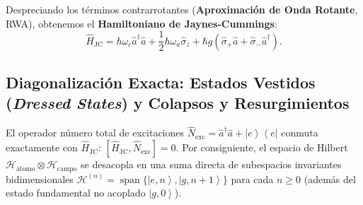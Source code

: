 \documentclass[11pt,a4paper,twoside]{report}
\theoremstyle{definition}
\theoremstyle{plain}
\theoremstyle{remark}
\newcommand{\ket}[1]{\left| #1 \right\rangle}
\newcommand{\ketbra}[2]{\left| #1 \right\rangle\!\left\langle #2 \right|}
\newcommand{\comm}[2]{\left[ #1, #2 \right]}
\newcommand{\Hil}{\mathcal{H}}
\newcommand{\op}[1]{\hat{#1}}
\begin{document}
Despreciando los términos contrarrotantes (\textbf{Aproximación de Onda Rotante}, RWA), obtenemos el \textbf{Hamiltoniano de Jaynes-Cummings}:
\begin{equation}
    \op{H}_{\text{JC}} = \hbar\omega_c \op{a}^\dagger\op{a} + \frac{1}{2}\hbar\omega_a \op{\sigma}_z + \hbar g\left( \op{\sigma}_+ \op{a} + \op{\sigma}_- \op{a}^\dagger \right).
\end{equation}

\subsection{Diagonalización Exacta: Estados Vestidos (\textit{Dressed States}) y Colapsos y Resurgimientos}

El operador número total de excitaciones $\op{N}_{\text{exc}} = \op{a}^\dagger\op{a} + \ketbra{e}{e}$ conmuta exactamente con $\op{H}_{\text{JC}}$: $\comm{\op{H}_{\text{JC}}}{\op{N}_{\text{exc}}} = 0$. Por consiguiente, el espacio de Hilbert $\Hil_{\text{átomo}} \otimes \Hil_{\text{campo}}$ se desacopla en una suma directa de subespacios invariantes bidimensionales $\Hil^{(n)} = \operatorname{span}\{\ket{e, n}, \ket{g, n+1}\}$ para cada $n \ge 0$ (además del estado fundamental no acoplado $\ket{g, 0}$).
\end{document}
